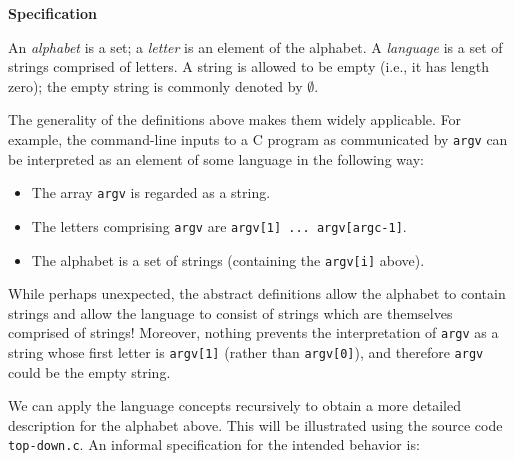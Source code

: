 \documentclass[12pt]{article}
\begin{document}
\textbf{Specification}

\bigskip

An \emph{alphabet} is a set; a \emph{letter} is an element of the alphabet. A \emph{language} is a set of strings
comprised of letters. A string is allowed to be empty (i.e., it has length zero); the empty
string is commonly denoted by $\emptyset$. 

\bigskip

The generality of the definitions above makes them widely applicable. For example, the
command-line inputs to a C program as communicated by \texttt{argv} can be interpreted as an
element of some language in the following way:
\begin{itemize}
	\item The array \texttt{argv} is regarded as a string.
	\item The letters comprising \texttt{argv} are \texttt{argv[1] ...  argv[argc-1]}.
	\item The alphabet is a set of strings (containing the \texttt{argv[i]} above).
\end{itemize} \hfill

While perhaps unexpected, the abstract definitions allow the alphabet to contain strings and
allow the language to consist of strings which are themselves comprised of strings! Moreover,
nothing prevents the interpretation of \texttt{argv} as a string whose first letter is \texttt{argv[1]} 
(rather than \texttt{argv[0]}), and therefore \texttt{argv} could be the empty string. 

\bigskip

We can apply the language concepts recursively to obtain a more detailed description for
the alphabet above. This will be illustrated using the source code \texttt{top-down.c}. 
An informal specification for the intended behavior is: 
\bigskip \bigskip
\end{document}
